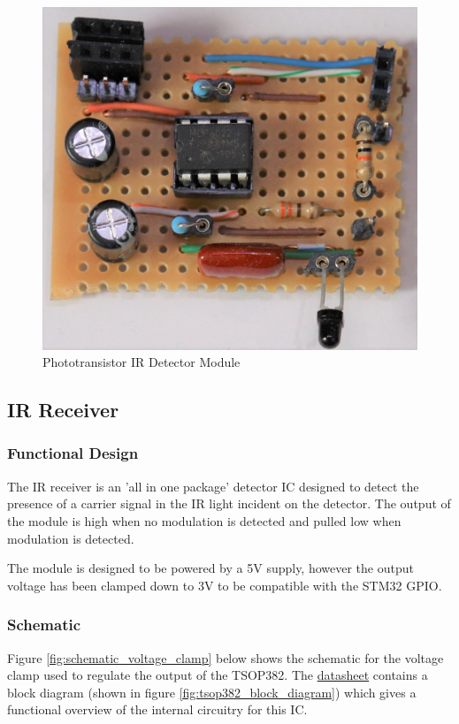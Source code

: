 \begin{figure}[H]
	\centering
	\includegraphics[width=.6\textwidth]{figures/modules/phototransistor_receiver.jpg}
	\caption{Phototransistor IR Detector Module}
	\label{fig:module_phototransistor_detector}
\end{figure}








\subsection{IR Receiver}

\subsubsection{Functional Design}
The IR receiver is an 'all in one package' detector IC designed to detect the presence of a carrier signal in the IR light incident on the detector. The output of the module is high when no modulation is detected and pulled low when modulation is detected.

The module is designed to be powered by a 5V supply, however the output voltage has been clamped down to 3V to be compatible with the STM32 GPIO.

\subsubsection{Schematic}
Figure \ref{fig:schematic_voltage_clamp} below shows the schematic for the voltage clamp used to regulate the output of the TSOP382. The \href{https://www.vishay.com/docs/82491/tsop382.pdf}{datasheet} contains a block diagram (shown in figure \ref{fig:tsop382_block_diagram}) which gives a functional overview of the internal circuitry for this IC.


